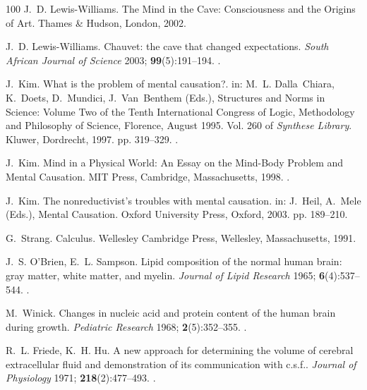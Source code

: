 \documentclass{ws-ijmpb}
\begin{document}
\begin{thebibliography}{100}
J.~D. Lewis-Williams. The Mind in the Cave: Consciousness and the Origins of
  Art. Thames \& Hudson, London, 2002.

J.~D. Lewis-Williams. Chauvet: the cave that changed expectations. \emph{South
  African Journal of Science} 2003; \textbf{99}(5):191--194.
\newblock \href {http://doi.org/10520/ejc97651} {}.

J.~Kim. What is the problem of mental causation?. in: M.~L. Dalla~Chiara,
  K.~Doets, D.~Mundici, J.~Van~Benthem (Eds.), Structures and Norms in Science:
  Volume Two of the Tenth International Congress of Logic, Methodology and
  Philosophy of Science, Florence, August 1995. Vol. 260 of \emph{Synthese
  Library}. Kluwer, Dordrecht, 1997. pp. 319--329.
\newblock \href {http://doi.org/10.1007/978-94-017-0538-7_19}
  {}.

J.~Kim. Mind in a Physical World: An Essay on the Mind-Body Problem and Mental
  Causation. MIT Press, Cambridge, Massachusetts, 1998.
\newblock \href {http://doi.org/10.7551/mitpress/4629.001.0001}
  {}.

J.~Kim. The nonreductivist's troubles with mental causation. in: J.~Heil,
  A.~Mele (Eds.), Mental Causation. Oxford University Press, Oxford, 2003. pp.
  189--210.

G.~Strang. Calculus. Wellesley Cambridge Press, Wellesley, Massachusetts, 1991.

J.~S. O'Brien, E.~L. Sampson. Lipid composition of the normal human brain: gray
  matter, white matter, and myelin. \emph{Journal of Lipid Research} 1965;
  \textbf{6}(4):537--544.
\newblock \href {http://doi.org/10.1016/S0022-2275(20)39619-X}
  {}.

M.~Winick. Changes in nucleic acid and protein content of the human brain
  during growth. \emph{Pediatric Research} 1968; \textbf{2}(5):352--355.
\newblock \href {http://doi.org/10.1203/00006450-196809000-00003}
  {}.

R.~L. Friede, K.~H. Hu. A new approach for determining the volume of cerebral
  extracellular fluid and demonstration of its communication with c.s.f..
  \emph{Journal of Physiology} 1971; \textbf{218}(2):477--493.
\newblock \href {http://doi.org/10.1113/jphysiol.1971.sp009629}
  {}.


\end{thebibliography}
\end{document}
